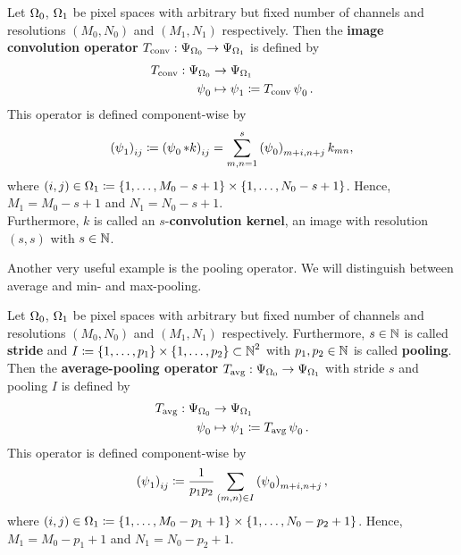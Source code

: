 \begin{definition}\label{def:convolution_op}
Let $\Omega_0$, $\Omega_1$ be pixel spaces with arbitrary but fixed number of channels and resolutions $(M_0,N_0)$ and $(M_1,N_1)$ respectively. Then the \textbf{image convolution operator} $T_{\text{conv}}: \Psi_{\Omega_0} \to \Psi_{\Omega_1}$ is defined by
\begin{align*}
T_{\text{conv}}: \Psi_{\Omega_0} &\to \Psi_{\Omega_1}\\
\operatorname{\psi}_0 &\mapsto \operatorname{\psi}_1 \coloneqq T_{\text{conv}}\operatorname{\psi}_0 .
\end{align*}
This operator is defined component-wise by
\begin{align}
\left( \operatorname{\psi}_1 \right)_{ij} \coloneqq  \left( \operatorname{\psi}_0 \ast k \right)_{ij} = \sum_{m,n=1}^s \left(\operatorname{\psi}_0\right)_{m+i,n+j}k_{mn},
\end{align}
where $(i,j) \in \Omega_1 \coloneqq \{1,\ldots, M_0-s+1\} \times \{1,\ldots, N_0-s+1\}$. Hence, $M_1 = M_0-s+1$ and $N_1 = N_0-s+1$.\\
Furthermore, $k$ is called an $s$-\textbf{convolution kernel}, an image with resolution $(s,s)$ with $s\in\operatorname{\mathbb{N}}$.
\end{definition}

Another very useful example is the pooling operator. We will distinguish between average and min- and max-pooling.

\begin{definition}\label{def:avg_pooling_op}
Let $\Omega_0$, $\Omega_1$ be pixel spaces with arbitrary but fixed number of channels and resolutions $(M_0,N_0)$ and $(M_1,N_1)$ respectively. Furthermore, $s\in\operatorname{\mathbb{N}}$ is called \textbf{stride} and $I\coloneqq \{1,\ldots,p_1\}\times \{1,\ldots,p_2\} \subset\operatorname{\mathbb{N}}^2$ with $p_1,p_2\in\operatorname{\mathbb{N}}$ is called \textbf{pooling}.\\
Then the \textbf{average-pooling operator} $T_{\text{avg}}: \Psi_{\Omega_0} \to \Psi_{\Omega_1}$ with stride $s$ and pooling $I$ is defined by
\begin{align*}
T_{\text{avg}}: \Psi_{\Omega_0} &\to \Psi_{\Omega_1}\\
\operatorname{\psi}_0 &\mapsto \operatorname{\psi}_1 \coloneqq T_{\text{avg}}\operatorname{\psi}_0 .
\end{align*}
This operator is defined component-wise by
\begin{align}
\left(\operatorname{\psi}_1\right)_{ij} \coloneqq  \frac{1}{p_1p_2} \sum_{(m,n)\in I}\left(\operatorname{\psi}_0\right)_{m+i, n+j},
\end{align}
where $(i,j) \in \Omega_1 \coloneqq \{1,\ldots, M_0-p_1+1\} \times \{1,\ldots, N_0-p_2+1\}$. Hence, $M_1 = M_0-p_1+1$ and $N_1 = N_0-p_2+1$.
\end{definition}

